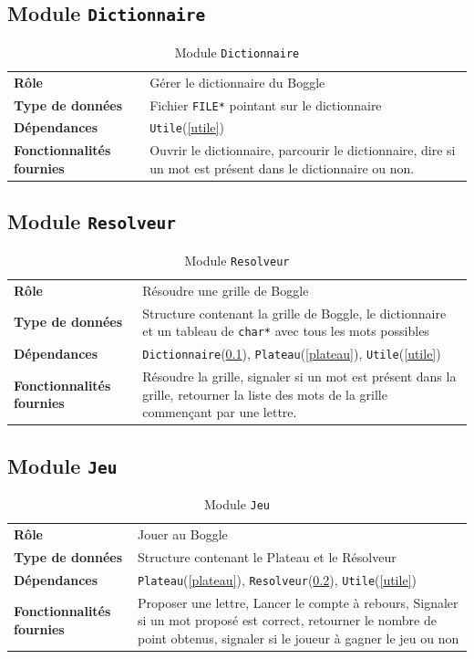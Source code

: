 \documentclass[12pt,a4paper,openany]{article}
\begin{document}
	\subsection{Module \texttt{Dictionnaire}}\label{dictionnaire}
		\begin{table}[H]
			\centering
		\begin{tabular}{p{5cm} p{12cm}}
			\textbf{Rôle} & Gérer le dictionnaire du Boggle\\
			\textbf{Type de données} & Fichier \texttt{FILE*} pointant sur le dictionnaire\\
			\textbf{Dépendances} & \texttt{Utile}(\ref{utile})\\
			\textbf{Fonctionnalités fournies} & Ouvrir le dictionnaire, parcourir le dictionnaire, dire si un mot est présent dans le dictionnaire ou non. 
		\end{tabular}
		\caption{Module \texttt{Dictionnaire}}
	\end{table}
	\subsection{Module \texttt{Resolveur}}\label{resolveur}
		\begin{table}[H]
			\centering
		\begin{tabular}{p{5cm} p{12cm}}
			\textbf{Rôle} & Résoudre une grille de Boggle\\
			\textbf{Type de données} & Structure contenant la grille de Boggle, le dictionnaire et un tableau de \texttt{char*} avec tous les mots possibles\\
			\textbf{Dépendances} & \texttt{Dictionnaire}(\ref{dictionnaire}), \texttt{Plateau}(\ref{plateau}), \texttt{Utile}(\ref{utile})\\
			\textbf{Fonctionnalités fournies} & Résoudre la grille, signaler si un mot est présent dans la grille, retourner la liste des mots de la grille
			commençant par une lettre. 
		\end{tabular}
		\caption{Module \texttt{Resolveur}}
	\end{table}
	\subsection{Module \texttt{Jeu}}\label{jeu}
		\begin{table}[H]
			\centering
		\begin{tabular}{p{5cm} p{12cm}}
			\textbf{Rôle} & Jouer au Boggle \\ 
			\textbf{Type de données} & Structure contenant le Plateau et le Résolveur\\ 
			\textbf{Dépendances} & \texttt{Plateau}(\ref{plateau}), \texttt{Resolveur}(\ref{resolveur}), \texttt{Utile}(\ref{utile})\\
			\textbf{Fonctionnalités fournies} & Proposer une lettre, Lancer le compte à rebours, Signaler si un mot proposé est correct, retourner le nombre de
			point obtenus, signaler si le joueur à gagner le jeu ou non
		\end{tabular}
		\caption{Module \texttt{Jeu}}
	\end{table}
\end{document}
